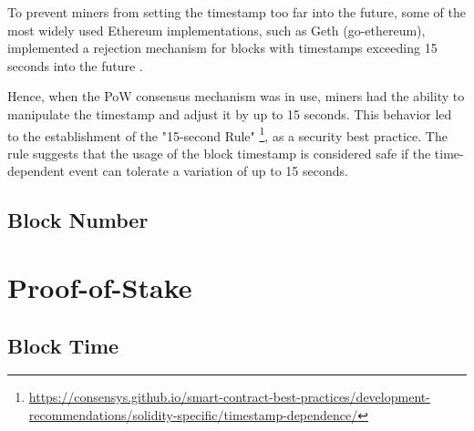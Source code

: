 %

To prevent miners from setting the timestamp too far into the future, some of the most widely used Ethereum implementations, such as Geth (go-ethereum), implemented a rejection mechanism for blocks with timestamps exceeding 15 seconds into the future \cite{go-ethereum-15-sek-limit}.

Hence, when the PoW consensus mechanism was in use, miners had the ability to
manipulate the timestamp and adjust it by up to 15 seconds. This behavior led
to the establishment of the "15-second Rule"
\footnote{\url{https://consensys.github.io/smart-contract-best-practices/development-recommendations/solidity-specific/timestamp-dependence/}},
as a security best practice. The
rule suggests that the usage of the block timestamp is considered
safe if the time-dependent event can tolerate a variation of up to 15 seconds. 



\subsection{Block Number}

%

\section{Proof-of-Stake}

\subsection{Block Time}

